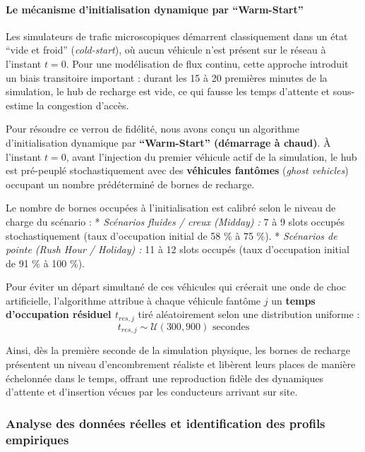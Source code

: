 \documentclass[11pt, a4paper]{article}
\begin{document}
\paragraph{Le mécanisme d'initialisation dynamique par
``Warm-Start''}\label{le-muxe9canisme-dinitialisation-dynamique-par-warm-start}

Les simulateurs de trafic microscopiques démarrent classiquement dans un
état ``vide et froid'' (\emph{cold-start}), où aucun véhicule n'est
présent sur le réseau à l'instant \(t = 0\). Pour une modélisation de
flux continu, cette approche introduit un biais transitoire important :
durant les 15 à 20 premières minutes de la simulation, le hub de
recharge est vide, ce qui fausse les temps d'attente et sous-estime la
congestion d'accès.

Pour résoudre ce verrou de fidélité, nous avons conçu un algorithme
d'initialisation dynamique par \textbf{``Warm-Start'' (démarrage à
chaud)}. À l'instant \(t=0\), avant l'injection du premier véhicule
actif de la simulation, le hub est pré-peuplé stochastiquement avec des
\textbf{véhicules fantômes} (\emph{ghost vehicles}) occupant un nombre
prédéterminé de bornes de recharge.

Le nombre de bornes occupées à l'initialisation est calibré selon le
niveau de charge du scénario : * \emph{Scénarios fluides / creux
(Midday) :} 7 à 9 slots occupés stochastiquement (taux d'occupation
initial de 58 \% à 75 \%). * \emph{Scénarios de pointe (Rush Hour /
Holiday) :} 11 à 12 slots occupés (taux d'occupation initial de 91 \% à
100 \%).

Pour éviter un départ simultané de ces véhicules qui créerait une onde
de choc artificielle, l'algorithme attribue à chaque véhicule fantôme
\(j\) un \textbf{temps d'occupation résiduel \(t_{res, j}\)} tiré
aléatoirement selon une distribution uniforme :
\[t_{res, j} \sim \mathcal{U}(300, 900) \text{ secondes}\]

Ainsi, dès la première seconde de la simulation physique, les bornes de
recharge présentent un niveau d'encombrement réaliste et libèrent leurs
places de manière échelonnée dans le temps, offrant une reproduction
fidèle des dynamiques d'attente et d'insertion vécues par les
conducteurs arrivant sur site.

\subsubsection{Analyse des données réelles et identification des profils
empiriques}\label{analyse-des-donnuxe9es-ruxe9elles-et-identification-des-profils-empiriques}
\end{document}
